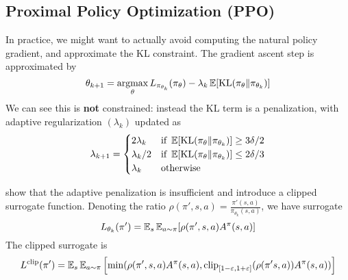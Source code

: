 \documentclass[../course-notes.tex]{subfiles}
\begin{document}
\subsection{Proximal Policy Optimization (PPO) \parencite{schulman2017proximal}}

In practice, we might want to actually avoid computing the natural policy gradient, and approximate the KL constraint. The gradient ascent step is approximated by
\begin{equation}\label{eq:PPOupdate}
	\theta_{k+1} =\operatorname*{\mathrm{argmax}}_\theta L_{\pi_{\theta_k}}(\pi_\theta) - \lambda_k \operatorname{\mathbb{E}}[\mathrm{KL}(\pi_\theta\|\pi_{\theta_k})]
\end{equation}
We can see this is \textbf{not} constrained: instead the KL term is a penalization, with adaptive regularization $(\lambda_k)$ updated as
\[
	\lambda_{k+1} = \begin{cases}
	2\lambda_k &\mbox{if } \operatorname{\mathbb{E}}[\operatorname{\mathrm{KL}}(\pi_\theta\|\pi_{\theta_k})] \geq 3\delta/2  \\
	\lambda_k/2 &\mbox{if }\operatorname{\mathbb{E}}[\operatorname{\mathrm{KL}}(\pi_\theta\|\pi_{\theta_k})] \leq 2\delta/3  \\
	\lambda_k &\mbox{otherwise}
	\end{cases}
\]

\textcite{schulman2017proximal} show that the adaptive penalization is insufficient and introduce a clipped surrogate function. Denoting the ratio $\rho(\pi',s,a) = \frac{\pi'(s,a)}{\pi_{\theta_k}(s,a)}$, we have surrogate
\[
	L_{\theta_k}(\pi') = \operatorname{\mathbb{E}}_s\operatorname{\mathbb{E}}_{a\sim\pi} [\rho(\pi',s,a)A^\pi(s,a)]
\]
The clipped surrogate is
\begin{equation}
	L^\mathrm{clip}(\pi') = \operatorname{\mathbb{E}}_s\operatorname{\mathbb{E}}_{a\sim\pi}
	\left[\min(\rho(\pi',s,a)A^\pi(s,a), \mathrm{clip}_{[1-\varepsilon,1+\varepsilon]}(\rho(\pi's,a))A^\pi(s,a))
	\right]
\end{equation}
\end{document}
